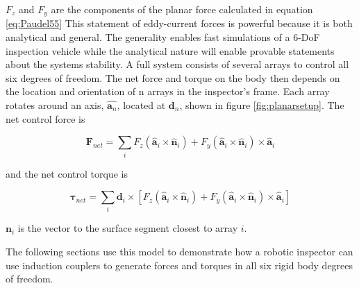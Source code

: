 \documentclass[letterpaper, 10 pt, conference]{ieeeconf}  %
\begin{document}
 $F_z$ and $F_y$ are the components of the planar force calculated in equation \ref{eq:Paudel55}
 This statement of eddy-current forces is powerful because it is both analytical and general. The generality enables fast simulations of a 6-DoF inspection vehicle while the analytical nature will enable provable statements about the systems stability.
A full system consists of several arrays to control all six degrees of freedom. The net force and torque on the body then depends on the location and orientation of n arrays in the inspector's frame. Each array rotates around an axis, $\hat{\textbf{a}_n}$, located at $\textbf{d}_n$, shown in figure \ref{fig:planarsetup}. The net control force is 
 
 \begin{equation}
 \label{eq:Fnet }
  \textbf{F}_{net} =  \sum_{i} F_z \left(\hat{\textbf{a}}_i \times \hat{\textbf{n}}_i \right) 
		+ F_y \left(\hat{\textbf{a}}_i \times \hat{\textbf{n}}_i \right) \times \hat{\textbf{a}}_i
 \end{equation}
 
 and the net control torque is
 
 \begin{equation}
 \label{Tnet}
 \boldsymbol{\tau}_{net} =  \sum_{i} \textbf{d}_i \times [F_z \left(\hat{\textbf{a}}_i \times \hat{\textbf{n}}_i \right) 
		+ F_y \left(\hat{\textbf{a}}_i \times \hat{\textbf{n}}_i \right) \times \hat{\textbf{a}}_i]
 \end{equation}

 $\textbf{n}_i$ is the vector to the surface segment closest to array $i$.   
 
\par The following sections use this model to demonstrate how a robotic inspector can use induction couplers to generate forces and torques in all six rigid body degrees of freedom.

%
\end{document}
